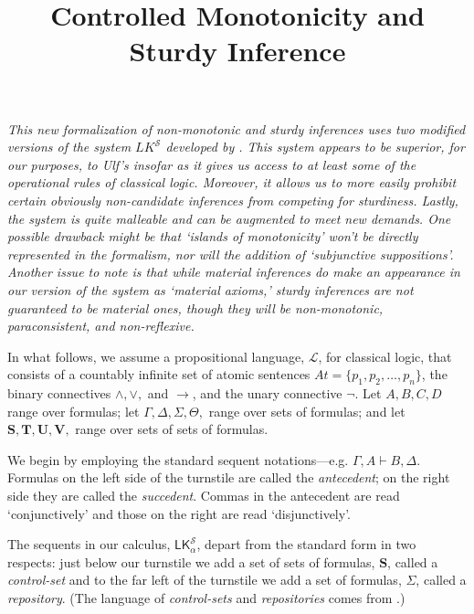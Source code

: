 \documentclass{article}                     %
\theoremstyle{theorem}
\theoremstyle{corollary}
\theoremstyle{lemma}
\theoremstyle{definition}
\theoremstyle{remark}
\theoremstyle{definition}
\theoremstyle{notation}
\theoremstyle{definition}
\theoremstyle{proposition}
\theoremstyle{definition}
\begin{document}
\sloppy
\title{Controlled Monotonicity and Sturdy Inference
}


\raggedbottom

\maketitle

\begin{framed}
\textit{This new formalization of non-monotonic and sturdy inferences uses two modified versions of the system $ LK^{\mathcal{S}} $ developed by \textcite{Piazza2015}. This system appears to be superior, for our purposes, to Ulf's insofar as it gives us access to at least some of the operational rules of classical logic. Moreover, it allows us to more easily prohibit certain obviously non-candidate inferences from competing for sturdiness. Lastly, the system is quite malleable and can be augmented to meet new demands. One possible drawback might be that `islands of monotonicity' won't be directly represented in the formalism, nor will the addition of `subjunctive suppositions'. Another issue to note is that while material inferences do make an appearance in our version of the system as `material axioms,' sturdy inferences are not guaranteed to be material ones, though they will be non-monotonic, paraconsistent, and non-reflexive.} 
\end{framed}


In what follows, we assume a propositional language, $ \mathcal{L} $, for classical logic, that consists of a countably infinite set of atomic sentences $At = \{p_1, p_2, \ldots,p_n\}$, the binary connectives $\wedge, \vee,$ and $ \to $, and the unary connective $\neg$. Let $A, B, C, D $ range over formulas; let $ \Gamma, \Delta, \Sigma, \Theta, $ range over sets of formulas; and let $ \mathbf{S, T, U ,V,}$ range over sets of sets of formulas. 

We begin by employing the standard sequent notations---e.g. $\Gamma, A \vdash B, \Delta $. Formulas on the left side of the turnstile are called the \textit{antecedent}; on the right side they are called the \textit{succedent}. Commas in the antecedent are read `conjunctively' and those on the right are read `disjunctively'.

The sequents in our calculus, $\mathsf{LK}^\mathcal{S}_\alpha $, depart from the standard form in two respects: just below our turnstile we add a set of sets of formulas, $\mathbf{S} $, called a \textit{control-set} and to the far left of the turnstile we add a set of formulas, $\Sigma $, called a \textit{repository}. (The language of \textit{control-sets} and \textit{repositories} comes from \textcite{Piazza2015}.)
\end{document}
